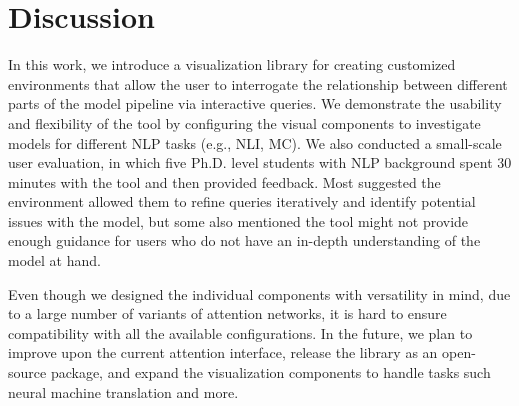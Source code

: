 \section{Discussion}
In this work, we introduce a visualization library for creating customized environments that allow the user to interrogate the relationship between different parts of the model pipeline via interactive queries.
%
We demonstrate the usability and flexibility of the tool by configuring the visual components to investigate models for different NLP tasks (e.g., NLI, MC).
%
We also conducted a small-scale user evaluation, in which five Ph.D. level students with NLP background spent 30 minutes with the tool and then provided feedback. Most suggested the environment allowed them to refine queries iteratively and identify potential issues with the model, but some also mentioned the tool might not provide enough guidance for users who do not have an in-depth understanding of the model at hand.

Even though we designed the individual components with versatility in mind, due to a large number of variants of attention networks, it is hard to ensure compatibility with all the available configurations.
%
In the future, we plan to improve upon the current attention interface, release the library as an open-source package, and expand the visualization components to handle tasks such neural machine translation and more.
